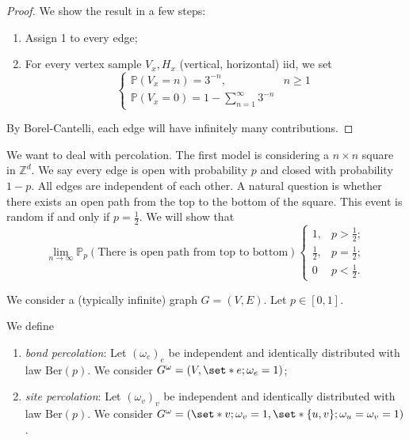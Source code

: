 \begin{proof}
    We show the result in a few steps:
    \begin{enumerate}[1.]
      \item Assign 1 to every edge;
      \item For every vertex sample \(V_x, H_x\) (vertical, horizontal) iid, we set 
        \[
        \begin{cases}
          \mathbb{P} \left(V_x=n\right)=3^{-n}, &  n \geq 1 \\
          \mathbb{P} \left(V_x=0\right)= 1- \sum_{n=1}^{\infty} 3^{-n} 
        \end{cases}
        \]
    \end{enumerate}
   By Borel-Cantelli, each edge will have infinitely many contributions.  
\end{proof}



We want to deal with percolation. The first model is considering a \(n \times n\) square in \(\mathbb{Z}^d\). We say every edge is open with probability \(p\) and closed with probability \(1-p\). All edges are independent of each other. A natural question is whether there exists an open path from the top to the bottom of the square. This event is random if and only if \(p=\frac{1}{2}\). We will show that 
\[\lim_{n \to \infty} \mathbb{P}_p \left(\text{There is open path from top to bottom}\right)
\begin{cases}
  1, & p>\frac{1}{2}; \\
  \frac{1}{2}, & p=\frac{1}{2}; \\
  0 & p< \frac{1}{2}.
\end{cases}
\]

We consider a (typically infinite) graph \(G=(V,E)\). Let \(p \in [0,1]\). 

\begin{defn}[Percolation]
    We define
    \begin{enumerate}[1)]
      \item \emph{bond percolation}: Let \(( \omega_e)_e\) be independent and identically distributed with law \(\mathrm{Ber}(p)\). We consider \(G^{\omega }=(V, \set*{e; \omega_e=1})\);
      \item \emph{site percolation}: Let \((\omega_v)_v\) be independent and identically distributed with law \(\mathrm{Ber}(p)\). We consider \(G^{\omega }=(\set*{v; \omega _v=1}, \set*{\{u,v\}; \omega _u=\omega _v=1})\).
      \end{enumerate}
\end{defn}

